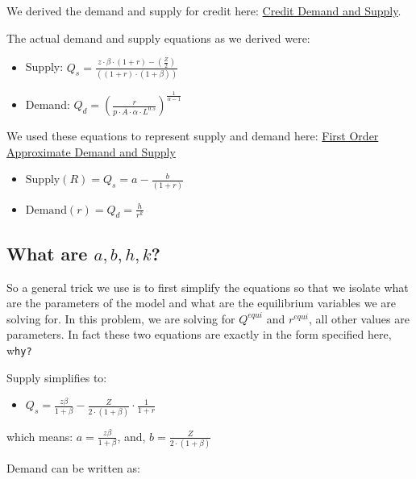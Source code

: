 \documentclass[
]{book}
\providecommand{\tightlist}{%
  \setlength{\itemsep}{0pt}\setlength{\parskip}{0pt}}
\begin{document}
We derived the demand and supply for credit here: \href{https://math4econ.github.io/derivative_application/K_borrow_firm.html}{Credit Demand and
Supply}.

The actual demand and supply equations as we derived were:

\begin{itemize}
\item
  Supply:
  \(Q_s =\frac{z\cdot \beta \cdot (1+r)-(\frac{Z}{2})}{((1+r)\cdot (1+\beta ))}\)
\item
  Demand:
  \(Q_d ={\left(\frac{r}{p\cdot A\cdot \alpha \cdot L^{0.5} }\right)}^{\frac{1}{\alpha -1}}\)
\end{itemize}

We used these equations to represent supply and demand here: \href{https://math4econ.github.io/matrix_application/demand_supply_taylor_approximate.html}{First
Order Approximate Demand and
Supply}

\begin{itemize}
\item
  \(\displaystyle \textrm{Supply}(R)=Q_s =a-\frac{b}{(1+r)}\)
\item
  \(\displaystyle \textrm{Demand}(r)=Q_d =\frac{h}{r^k }\)
\end{itemize}

\hypertarget{what-are-abhk}{%
\subsection{\texorpdfstring{What are \(a,b,h,k\)?}{What are a,b,h,k?}}\label{what-are-abhk}}

So a general trick we use is to first simplify the equations so that we
isolate what are the parameters of the model and what are the
equilibrium variables we are solving for. In this problem, we are
solving for \(Q^{equi}\) and \(r^{equi}\), all other values are parameters.
In fact these two equations are exactly in the form specified here,
w\texttt{hy?}

Supply simplifies to:

\begin{itemize}
\tightlist
\item
  \(\displaystyle Q_s =\frac{z\beta }{1+\beta }-\frac{Z}{2\cdot (1+\beta )}\cdot \frac{1}{1+r}\)
\end{itemize}

which means: \(a=\frac{z\beta }{1+\beta }\), and,
\(b=\frac{Z}{2\cdot (1+\beta )}\)

Demand can be written as:
\end{document}
